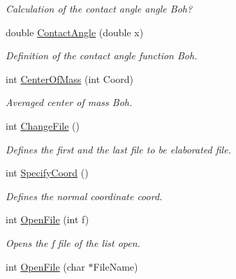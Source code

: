 \begin{DoxyCompactItemize}
\begin{DoxyCompactList}\small\item\em \-Calculation of the contact angle  angle \-Boh? \end{DoxyCompactList}\item 
\hypertarget{classElPoly_a2dd3ba2334c4444c4ef406347618c170}{double \hyperlink{classElPoly_a2dd3ba2334c4444c4ef406347618c170}{\-Contact\-Angle} (double x)}\label{classElPoly_a2dd3ba2334c4444c4ef406347618c170}

\begin{DoxyCompactList}\small\item\em \-Definition of the contact angle function \-Boh. \end{DoxyCompactList}\item 
\hypertarget{classElPoly_a59529de9a660df4734a218130963ae25}{int \hyperlink{classElPoly_a59529de9a660df4734a218130963ae25}{\-Center\-Of\-Mass} (int \-Coord)}\label{classElPoly_a59529de9a660df4734a218130963ae25}

\begin{DoxyCompactList}\small\item\em \-Averaged center of mass \-Boh. \end{DoxyCompactList}\item 
\hypertarget{classElPoly_a5fa485410c0b7e02f523f96f33504435}{int \hyperlink{classElPoly_a5fa485410c0b7e02f523f96f33504435}{\-Change\-File} ()}\label{classElPoly_a5fa485410c0b7e02f523f96f33504435}

\begin{DoxyCompactList}\small\item\em \-Defines the first and the last file to be elaborated  file. \end{DoxyCompactList}\item 
\hypertarget{classElPoly_af3b99b4a504ae35256dfa33c9f1bfd31}{int \hyperlink{classElPoly_af3b99b4a504ae35256dfa33c9f1bfd31}{\-Specify\-Coord} ()}\label{classElPoly_af3b99b4a504ae35256dfa33c9f1bfd31}

\begin{DoxyCompactList}\small\item\em \-Defines the normal coordinate  coord. \end{DoxyCompactList}\item 
\hypertarget{classElPoly_a3432306726a27b310ec27b3900894b11}{int \hyperlink{classElPoly_a3432306726a27b310ec27b3900894b11}{\-Open\-File} (int f)}\label{classElPoly_a3432306726a27b310ec27b3900894b11}

\begin{DoxyCompactList}\small\item\em \-Opens the f file of the list  open. \end{DoxyCompactList}\item 
\hypertarget{classElPoly_a5ddc1cdb4d65932381030dba86448813}{int \hyperlink{classElPoly_a5ddc1cdb4d65932381030dba86448813}{\-Open\-File} (char $\ast$\-File\-Name)}\label{classElPoly_a5ddc1cdb4d65932381030dba86448813}


\end{DoxyCompactItemize}

